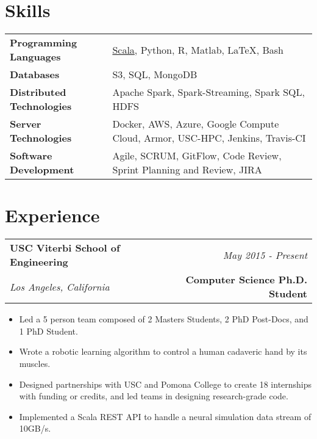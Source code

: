 \documentclass[10pt,a4paper]{article}
\begin{document}
  \newpage

\vspace*{-15mm}\section*{Skills}
  \noindent\begin{tabularx}{17cm}{l X}
    \textbf{Programming Languages} & \href{https://github.com/bcohn12/space/blob/master/src/main/scala/bbdl/space/MyAdder.scala}{Scala}, Python, R, Matlab, \LaTeX, Bash \\
    \textbf{Databases} & S3, SQL, MongoDB \\
    \textbf{Distributed Technologies} & Apache Spark, Spark-Streaming, Spark SQL, HDFS \\
    \textbf{Server Technologies} & Docker, AWS, Azure, Google Compute Cloud, Armor, USC-HPC, Jenkins, Travis-CI \\
    \textbf{Software Development} & Agile, SCRUM, GitFlow, Code Review, Sprint Planning and Review, JIRA \\
  \end{tabularx}



    \vspace*{3mm}\section*{Experience}
  \noindent\begin{tabularx}{17cm}{X r}
    \textbf{USC Viterbi School of Engineering} & \textit{May 2015 - Present} \\
    \textit{Los Angeles, California} & \textbf{Computer Science Ph.D. Student} \\
  \end{tabularx}

  \vspace*{1mm}\noindent\begin{minipage}{17cm}
    \begin{itemize}[leftmargin=6mm,topsep=0mm,itemsep=-1mm]
      \item Led a 5 person team composed of 2 Masters Students, 2 PhD Post-Docs, and 1 PhD Student.
      \item Wrote a robotic learning algorithm to control a human cadaveric hand by its muscles. 
     \item Designed partnerships with USC and Pomona College to create 18 internships with funding or credits, and led teams in designing research-grade code.
      \item Implemented a Scala REST API to handle a neural simulation data stream of 10GB/s.
    \end{itemize}
  \end{minipage}
\end{document}

